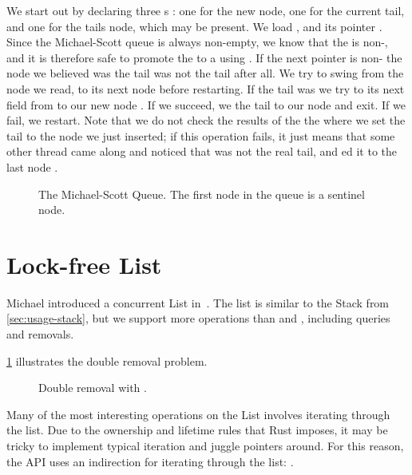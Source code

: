 We start out by declaring three s : one for the new node, one for the
current tail, and one for the tails  node, which may be present.  We load 
, and its  pointer .  Since the Michael-Scott queue is always
non-empty, we know that the  is non-, and it is therefore safe to promote the
 to a  using .  If the next pointer is non-
the node we believed was the tail was not the tail after all. We try to swing  from the
node we read, to its next node  before restarting.  If the tail was  we try
to  its next field from  to our new node . If we succeed, we
 the tail to our node and exit. If we fail, we restart.  Note that we do not check the
results of the the  where we set the tail to the node we just inserted; if this operation
fails, it just means that some other thread came along and noticed that  was not the
real tail, and ed it to the last node .

\begin{figure}[ht]
\centering

\caption{The Michael-Scott Queue. The first node in the queue is a sentinel node.}
\end{figure}



\section{Lock-free List}

Michael introduced a concurrent List in~\cite{michael2002high}. The list is similar to the
Stack from \cref{sec:usage-stack}, but we support more operations than  and ,
including queries and removals.

\cref{fig:list-remove} illustrates the double removal problem.

\begin{figure}[ht]
\centering

\caption{Double removal with \label{fig:list-remove}.}
\end{figure}


Many of the most interesting operations on the List involves iterating through the list. Due to the
ownership and lifetime rules that Rust imposes, it may be tricky to implement typical iteration
and juggle pointers around. For this reason, the API uses an indirection for iterating through the
list: .

